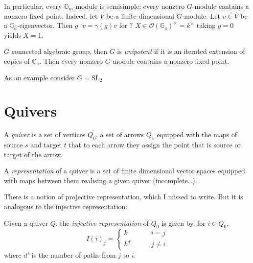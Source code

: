 In particular, every $\mathbb{G}_m$-module is semisimple: every nonzero
$G$-module contains a nonzero fixed point. Indeed, let $V$ be a
finite-dimensional $G$-module. Let $v \in V$ be a $\mathbb{G}_a$-eigenvector.
Then $g\cdot v=\gamma(g)v$ for ? $X \in
\mathcal{O}(\mathbb{G}_a)^{\times}=k^{\times}$ taking $g=0$ yields $X=1$.

$G$ connected algebraic group, then $G$ is {\it unipotent} if it is an iterated
extension of copies of $\mathbb{G}_a$. Then every nonzero $G$-module contains a
nonzero fixed point.

As an example consider $G=\text{SL}_2$

\section{Quivers}
\label{section-quivers}

\begin{definition}
\label{definition-quiver}
A {\it quiver} is a set of vertices $Q_0$, a set of arrows $Q_1$ equipped with
the maps of source $s$ and target $t$ that to each arrow they assign the point
that is source or target of the arrow.
\end{definition}

\begin{definition}
\label{definition-representation-of-quiver}
A {\it representation} of a quiver is a set of finite dimensional vector spaces
equipped with maps between them realising a given quiver (incomplete…).
\end{definition}

There is a notion of projective representation, which I missed to write. But it
is analogous to the injective representation:

\begin{definition}
\label{definition-injective-representation-of-quivers}
Given a quiver $Q$, the {\it injective representation} of $Q_0$ is given by, for
$i \in Q_0$,
$$
I(i)_j=\begin{cases}
k\qquad &i=j \\
k^{d'}\qquad &j \neq i
\end{cases}
$$
where $d'$ is the number of paths from $j$ to $i$.
\end{definition}








